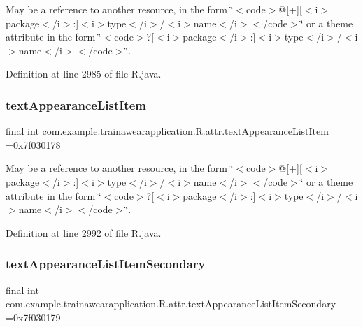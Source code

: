 May be a reference to another resource, in the form \char`\"{}$<$code$>$@\mbox{[}+\mbox{]}\mbox{[}$<$i$>$package$<$/i$>$\+:\mbox{]}$<$i$>$type$<$/i$>$/$<$i$>$name$<$/i$>$$<$/code$>$\char`\"{} or a theme attribute in the form \char`\"{}$<$code$>$?\mbox{[}$<$i$>$package$<$/i$>$\+:\mbox{]}$<$i$>$type$<$/i$>$/$<$i$>$name$<$/i$>$$<$/code$>$\char`\"{}. 

Definition at line 2985 of file R.\+java.

\mbox{\label{classcom_1_1example_1_1trainawearapplication_1_1_r_1_1attr_aca32edb54bde3b5d70be4efa1efc9392}} 
\subsubsection{\texorpdfstring{textAppearanceListItem}{textAppearanceListItem}}
{\footnotesize\ttfamily final int com.\+example.\+trainawearapplication.\+R.\+attr.\+text\+Appearance\+List\+Item =0x7f030178\hspace{0.3cm}{\ttfamily [static]}}

May be a reference to another resource, in the form \char`\"{}$<$code$>$@\mbox{[}+\mbox{]}\mbox{[}$<$i$>$package$<$/i$>$\+:\mbox{]}$<$i$>$type$<$/i$>$/$<$i$>$name$<$/i$>$$<$/code$>$\char`\"{} or a theme attribute in the form \char`\"{}$<$code$>$?\mbox{[}$<$i$>$package$<$/i$>$\+:\mbox{]}$<$i$>$type$<$/i$>$/$<$i$>$name$<$/i$>$$<$/code$>$\char`\"{}. 

Definition at line 2992 of file R.\+java.

\mbox{\label{classcom_1_1example_1_1trainawearapplication_1_1_r_1_1attr_a5f56fa296b9667a53d673a89bce08c86}} 
\subsubsection{\texorpdfstring{textAppearanceListItemSecondary}{textAppearanceListItemSecondary}}
{\footnotesize\ttfamily final int com.\+example.\+trainawearapplication.\+R.\+attr.\+text\+Appearance\+List\+Item\+Secondary =0x7f030179\hspace{0.3cm}{\ttfamily [static]}}

